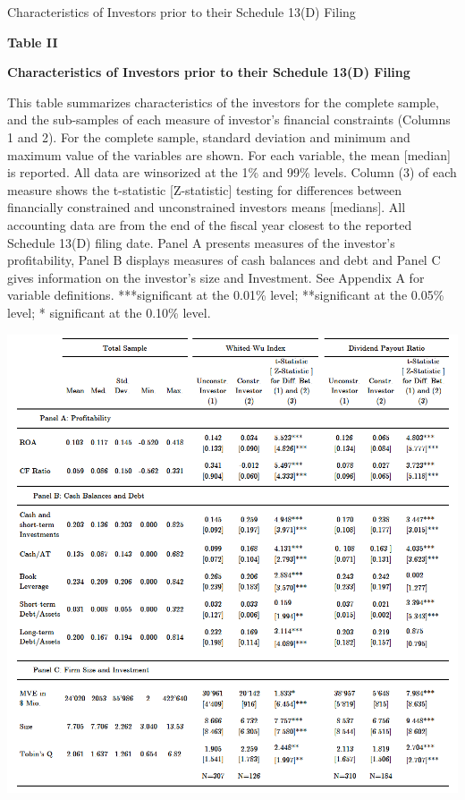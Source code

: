 \documentclass[12pt]{article}
\begin{document}
\begin{table}[!htbp]
	\centering
	\captionsetup{textformat=empty,labelformat=blank}
	\caption{Characteristics of Investors prior to their Schedule 13(D) Filing}
	\textbf{Table II}\par\medskip
	\large\textbf{Characteristics of Investors prior to their Schedule 13(D) Filing}\par\medskip
	\justifying
	\footnotesize\noindent{}This table summarizes characteristics of the investors for the complete sample, and the sub-samples of each measure of investor's financial constraints (Columns 1 and 2). For the complete sample, standard deviation and minimum and maximum value of the variables are shown. For each variable, the mean [median] is reported. All data are winsorized at the 1\% and 99\% levels. Column (3) of each measure shows the t-statistic [Z-statistic] testing for differences between financially constrained and unconstrained investors means [medians]. All accounting data are from the end of the fiscal year closest to the reported Schedule 13(D) filing date. Panel A presents measures of the investor's profitability, Panel B displays  measures of cash balances and debt and Panel C gives information on the investor's size and Investment. See Appendix A for variable definitions. ***significant at the 0.01\% level; **significant at the 0.05\% level; * significant at the 0.10\% level.\par\medskip
	\centering													
	\begin{adjustbox}{width=\textwidth}
		\includegraphics{summary1final}
	\end{adjustbox}\par\medskip
\end{table}
\end{document}
